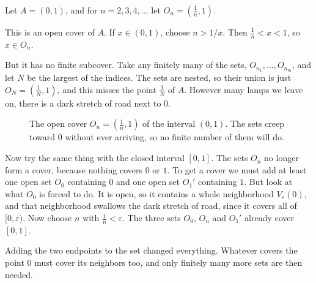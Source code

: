 \begin{example}\label{ex:cover-open-interval}
Let $A = (0,1)$, and for $n = 2, 3, 4, \ldots$ let $O_n = \left(\frac1n, 1\right)$.

This is an open cover of $A$.  If $x \in (0,1)$, choose $n > 1/x$.  Then $\frac1n < x < 1$, so $x \in O_n$.

But it has no finite subcover.  Take any finitely many of the sets, $O_{n_1}, \ldots, O_{n_m}$, and let $N$ be the largest of the indices.  The sets are nested, so their union is just $O_N = \left(\frac1N, 1\right)$, and this misses the point $\frac{1}{N}$ of $A$.  However many lamps we leave on, there is a dark stretch of road next to $0$.
\end{example}

\begin{figure}
\centering
{}
\caption{The open cover $O_n = \left(\frac1n, 1\right)$ of the interval $(0,1)$.  The sets creep toward $0$ without ever arriving, so no finite number of them will do.}
\label{fig:open-cover}
\end{figure}

\begin{example}\label{ex:cover-closed-interval}
Now try the same thing with the closed interval $[0,1]$.  The sets $O_n$ no longer form a cover, because nothing covers $0$ or $1$.  To get a cover we must add at least one open set $O_0$ containing $0$ and one open set $O_1'$ containing $1$.  But look at what $O_0$ is forced to do.  It is open, so it contains a whole neighborhood $V_{\varepsilon}(0)$, and that neighborhood swallows the dark stretch of road, since it covers all of $[0, \varepsilon)$.  Now choose $n$ with $\frac1n < \varepsilon$.  The three sets $O_0$, $O_n$ and $O_1'$ already cover $[0,1]$.

Adding the two endpoints to the set changed everything.  Whatever covers the point $0$ must cover its neighbors too, and only finitely many more sets are then needed.
\end{example}

